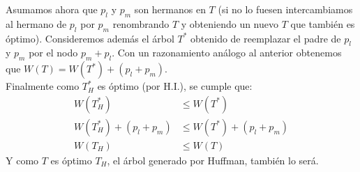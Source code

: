 \documentclass[dcc,uchile]{fcfmcourse}
\begin{document}
\begin{enumerate}[a)]
    Asumamos ahora que $p_{l}$ y $p_{m}$ son hermanos en $T$ (si no lo fuesen intercambiamos al hermano de $p_{l}$ por $p_{m}$ renombrando $T$ y obteniendo un nuevo $T$ que también es óptimo). Consideremos además el árbol $T^*$ obtenido de reemplazar el padre de $p_{l}$ y $p_{m}$ por el nodo $p_{m}+p_{l}$. Con un razonamiento análogo al anterior obtenemos que $W(T) = W(T^*) + (p_{l}+p_{m})$.\\
    
    Finalmente como $T_H^*$ es óptimo (por H.I.), se cumple que:
    \begin{align*}
        W(T_H^*) &\le W(T^*) \\
        W(T_H^*) + (p_{l}+p_{m}) &\le W(T^*) + (p_{l}+p_{m})\\
        W(T_H) &\le W(T)
    \end{align*}
    Y como $T$ es óptimo $T_H$, el árbol generado por Huffman, también lo será.
\end{enumerate}
\end{document}
